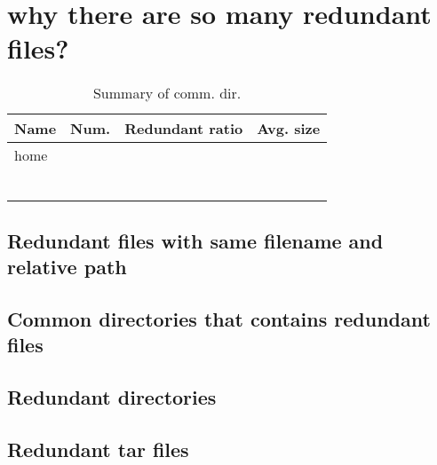 
\section{why there are so many redundant files?}
\label{sec:redundant_layers}

\begin{table} 
	\centering 
	\scriptsize  
	\caption{Summary of comm. dir.} \label{tbl:redundant_ratio} 
	\begin{tabular}{|l|l|l|l|}%
		\hline 
		Name & Num. & Redundant ratio & Avg. size \\
		\hline
		home &   &   &     \\
		\hline
		&   &   &      \\
		\hline
		&   &   &      \\
		\hline
		&  &  &  \\
		\hline
		& &  &   \\
		\hline
		& &  &   \\
		\hline
		&  &  & \\
		\hline
	\end{tabular} 
\end{table} 

\subsection{Redundant files with same filename and relative path}

\subsection{Common directories that contains redundant files}

\subsection{Redundant directories}

\subsection{Redundant tar files}

